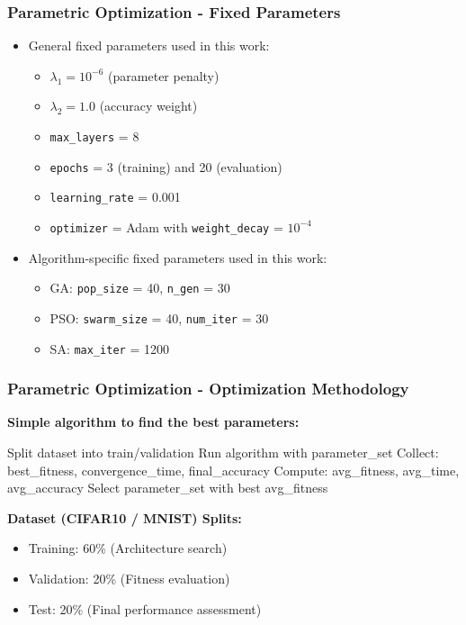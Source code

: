 \documentclass{beamer}
\begin{document}
    \begin{frame}
        \frametitle{Parametric Optimization - Fixed Parameters}
        \begin{itemize}
            \item General fixed parameters used in this work: 
            \begin{itemize}
                \item $\lambda_1 = 10^{-6}$ (parameter penalty)
                \item $\lambda_2 = 1.0$ (accuracy weight)
                \item \texttt{max\_layers} = 8
                \item \texttt{epochs} = 3 (training) and 20 (evaluation)
                \item \texttt{learning\_rate} = 0.001
                \item \texttt{optimizer} = Adam with \texttt{weight\_decay} = $10^{-4}$
            \end{itemize}
            \item Algorithm-specific fixed parameters used in this work:
            \begin{itemize}
                \item GA: \texttt{pop\_size} = 40, \texttt{n\_gen} = 30
                \item PSO: \texttt{swarm\_size} = 40, \texttt{num\_iter} = 30
                \item SA: \texttt{max\_iter} = 1200
            \end{itemize}
        \end{itemize}
    \end{frame}

    \begin{frame}
        \frametitle{Parametric Optimization - Optimization Methodology}
        \textbf{Simple algorithm to find the best parameters:}
        {
            \small
            \begin{algorithmic}
                        \State Split dataset into train/validation
                        \State Run algorithm with parameter\_set
                        \State Collect: best\_fitness, convergence\_time, final\_accuracy
                    \EndFor
                    \State Compute: avg\_fitness, avg\_time, avg\_accuracy
                \EndFor
                \State Select parameter\_set with best avg\_fitness
            \EndFor
        \end{algorithmic}
        }

        \textbf{Dataset (CIFAR10 / MNIST) Splits:}
        \begin{itemize}
            \item Training: 60\% (Architecture search)
            \item Validation: 20\% (Fitness evaluation)
            \item Test: 20\% (Final performance assessment)
        \end{itemize}
    \end{frame}
\end{document}
